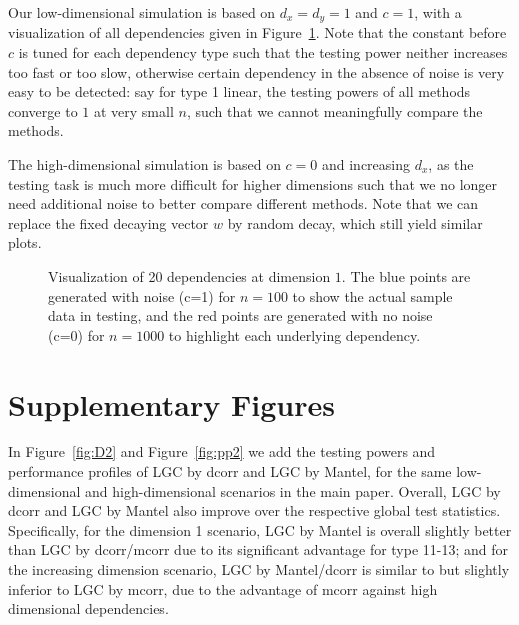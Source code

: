 \documentclass[11pt]{article}
\begin{document}
Our low-dimensional simulation is based on $d_{x}=d_{y}=1$ and $c=1$, with a visualization of all dependencies given in Figure~\ref{fig0}. Note that the constant before $c$ is tuned for each dependency type such that the testing power neither increases too fast or too slow, otherwise certain dependency in the absence of noise is very easy to be detected: say for type 1 linear, the testing powers of all methods converge to $1$ at very small $n$, such that we cannot meaningfully compare the methods.

The high-dimensional simulation is based on $c=0$ and increasing $d_{x}$, as the testing task is much more difficult for higher dimensions such that we no longer need additional noise to better compare different methods. Note that we can replace the fixed decaying vector $w$ by random decay, which still yield similar plots.

\begin{figure}[htbp]
\caption{Visualization of 20 dependencies at dimension $1$. The blue points are generated with noise (c=1) for $n=100$ to show the actual sample data in testing, and the red points are generated with no noise (c=0) for $n=1000$ to highlight each underlying dependency.}
\label{fig0}
\end{figure}

\section{Supplementary Figures}

In Figure~\ref{fig:D2} and Figure~\ref{fig:pp2} we add the testing powers and performance profiles of LGC by dcorr and LGC by Mantel, for the same low-dimensional and high-dimensional scenarios in the main paper. Overall, LGC by dcorr and LGC by Mantel also improve over the respective global test statistics. Specifically, for the dimension 1 scenario, LGC by Mantel is overall slightly better than LGC by dcorr/mcorr due to its significant advantage for type 11-13; and for the increasing dimension scenario, LGC by Mantel/dcorr is similar to but slightly inferior to LGC by mcorr, due to the advantage of mcorr against high dimensional dependencies.
\end{document}
